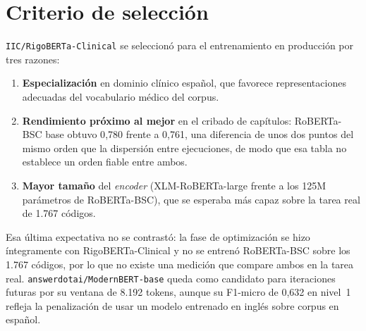 \section{Criterio de selección}

\texttt{IIC/RigoBERTa-Clinical} se seleccionó para el entrenamiento en producción por tres razones:

\begin{enumerate}
 \item \textbf{Especialización} en dominio clínico español, que favorece representaciones adecuadas del vocabulario médico del corpus.
 \item \textbf{Rendimiento próximo al mejor} en el cribado de capítulos: RoBERTa-BSC base obtuvo 0{,}780 frente a 0{,}761, una diferencia de unos dos puntos del mismo orden que la dispersión entre ejecuciones, de modo que esa tabla no establece un orden fiable entre ambos.
 \item \textbf{Mayor tamaño} del \emph{encoder} (XLM-RoBERTa-large frente a los 125M parámetros de RoBERTa-BSC), que se esperaba más capaz sobre la tarea real de 1.767 códigos.
\end{enumerate}

Esa última expectativa no se contrastó: la fase de optimización se hizo íntegramente con RigoBERTa-Clinical y no se entrenó RoBERTa-BSC sobre los 1.767 códigos, por lo que no existe una medición que compare ambos en la tarea real. \texttt{answerdotai/ModernBERT-base} queda como candidato para iteraciones futuras por su ventana de 8.192 tokens, aunque su F1-micro de 0{,}632 en nivel~1 refleja la penalización de usar un modelo entrenado en inglés sobre corpus en español.
